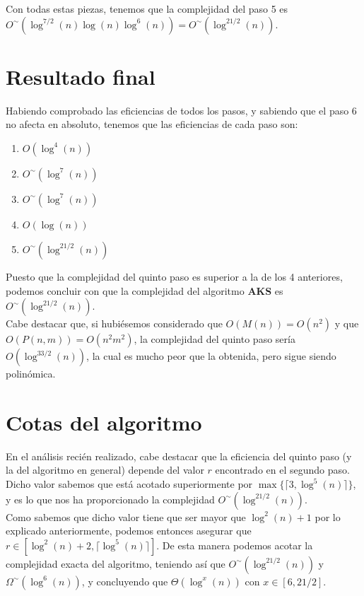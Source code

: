 Con todas estas piezas, tenemos que la complejidad del paso 5 es $O^\sim(\log^{7/2}(n)\log(n)\log^6(n)) = O^\sim(\log^{21/2}(n))$.

\section{Resultado final}

Habiendo comprobado las eficiencias de todos los pasos, y sabiendo que el paso 6 no afecta en absoluto, tenemos que las eficiencias de cada paso son:

\begin{enumerate}
	\item $O(\log^4(n))$
	\item $O^\sim(\log^7(n))$
	\item $O^\sim(\log^7(n))$
	\item $O(\log(n))$
	\item $O^\sim(\log^{21/2}(n))$
\end{enumerate}

Puesto que la complejidad del quinto paso es superior a la de los 4 anteriores, podemos concluir con que la complejidad del algoritmo \textbf{AKS} es $O^\sim(\log^{21/2}(n))$.\\

Cabe destacar que, si hubiésemos considerado que $O(M(n)) = O(n^2)$ y que $O(P(n, m)) = O(n^2m^2)$, la complejidad del quinto paso sería $O(\log^{33/2}(n))$, la cual es mucho peor que la obtenida, pero sigue siendo polinómica.

\section{Cotas del algoritmo}

En el análisis recién realizado, cabe destacar que la eficiencia del quinto paso (y la del algoritmo en general) depende del valor $r$ encontrado en el segundo paso. Dicho valor sabemos que está acotado superiormente por $\max\{\lceil 3, \log^5(n) \rceil\}$, y es lo que nos ha proporcionado la complejidad $O^\sim(\log^{21/2}(n))$.\\

Como sabemos que dicho valor tiene que ser mayor que $\log^2(n) + 1$ por lo explicado anteriormente, podemos entonces asegurar que $r \in [\log^2(n) + 2, \lceil\log^5(n)\rceil]$. De esta manera podemos acotar la complejidad exacta del algoritmo, teniendo así que $O^\sim(\log^{21/2}(n))$ y $\Omega^\sim(\log^6(n))$, y concluyendo que $\Theta(\log^x(n))$ con $x \in [6, 21/2]$.

\endinput
